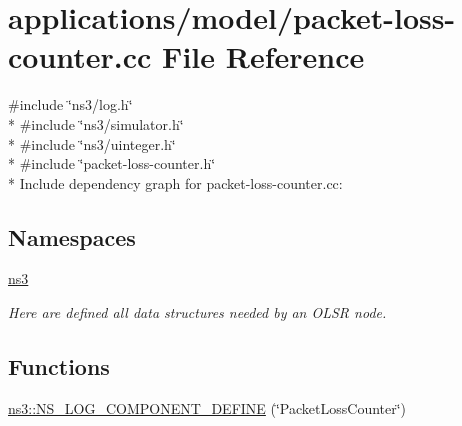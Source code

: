 \hypertarget{packet-loss-counter_8cc}{}\section{applications/model/packet-\/loss-\/counter.cc File Reference}
\label{packet-loss-counter_8cc}
{\ttfamily \#include \char`\"{}ns3/log.\+h\char`\"{}}\\*
{\ttfamily \#include \char`\"{}ns3/simulator.\+h\char`\"{}}\\*
{\ttfamily \#include \char`\"{}ns3/uinteger.\+h\char`\"{}}\\*
{\ttfamily \#include \char`\"{}packet-\/loss-\/counter.\+h\char`\"{}}\\*
Include dependency graph for packet-\/loss-\/counter.cc\+:
\subsection*{Namespaces}
\begin{DoxyCompactItemize}
\item 
 \hyperlink{namespacens3}{ns3}
\begin{DoxyCompactList}\small\item\em Here are defined all data structures needed by an O\+L\+SR node. \end{DoxyCompactList}\end{DoxyCompactItemize}
\subsection*{Functions}
\begin{DoxyCompactItemize}
\item 
\hyperlink{namespacens3_a5c30102577edb0c929d96cb87923e9b9}{ns3\+::\+N\+S\+\_\+\+L\+O\+G\+\_\+\+C\+O\+M\+P\+O\+N\+E\+N\+T\+\_\+\+D\+E\+F\+I\+NE} (\char`\"{}Packet\+Loss\+Counter\char`\"{})
\end{DoxyCompactItemize}
